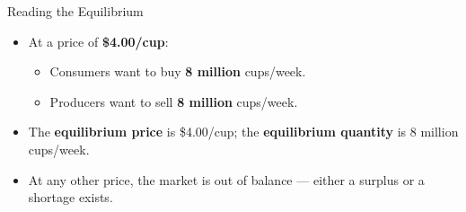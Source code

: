 \documentclass[aspectratio=169]{beamer}
\begin{document}
\begin{frame}{Reading the Equilibrium}
\transfade
\begin{itemize}[<+->]
  \item At a price of \textbf{\$4.00/cup}:
  \begin{itemize}[<+->]
    \item Consumers want to buy \textbf{8 million} cups/week.
    \item Producers want to sell \textbf{8 million} cups/week.
  \end{itemize}
  \item The \textbf{equilibrium price} is \$4.00/cup; the \textbf{equilibrium quantity} is 8 million cups/week.
  \item At any other price, the market is out of balance --- either a surplus or a shortage exists.
\end{itemize}
\end{frame}
\end{document}
